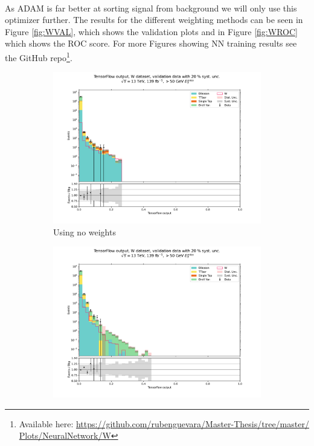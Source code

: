 \documentclass[12pt, a4paper]{book}
\begin{document}
\\As ADAM is far better at sorting signal from background we will only use this optimizer further. The results for the different weighting methods can be seen in Figure \ref{fig:WVAL}, which shows the 
validation plots and in Figure \ref{fig:WROC} which shows the ROC score. For more Figures showing NN training results see the GitHub repo\footnote{Available here: \href{https://github.com/rubenguevara/Master-Thesis/tree/master/Plots/NeuralNetwork/W}{https://github.com/rubenguevara/Master-Thesis/tree/master/\\Plots/NeuralNetwork/W}}. \\
\begin{figure}[!ht]
	\centering
	\begin{subfigure}[b]{0.49\textwidth}
         \centering
         \includegraphics[width=1\textwidth]{Unweighted/VAL.pdf}
         \caption{Using no weights}\label{fig:WVALUW}
      \end{subfigure}
      \hfill
      \begin{subfigure}[b]{0.49\textwidth}
         \centering
         \includegraphics[width=1\textwidth]{Weighted/VAL.pdf}

\end{subfigure}
\end{figure}
\end{document}
